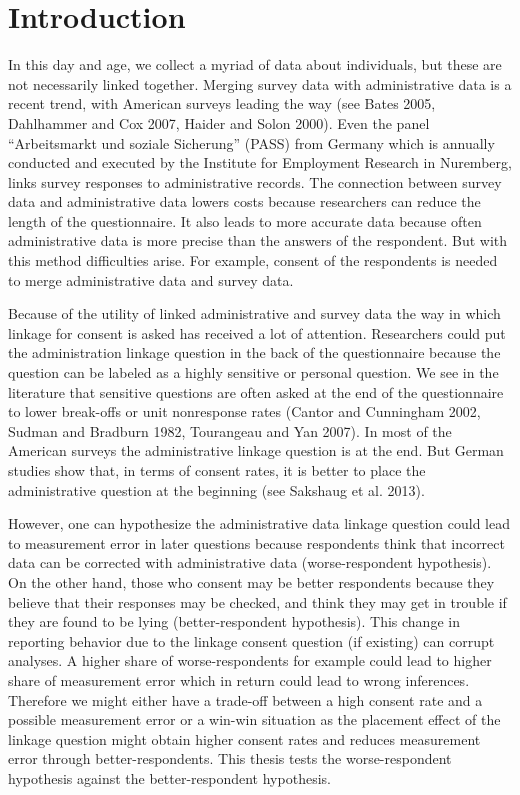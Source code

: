 \section{Introduction}

In this day and age, we collect a myriad of data about individuals, but these are not necessarily linked together. Merging survey data with administrative data is a recent trend, with American surveys leading the way (see Bates 2005, Dahlhammer and Cox 2007, Haider and Solon 2000). Even the panel ``Arbeitsmarkt und soziale Sicherung'' (PASS) from Germany which is annually conducted and executed by the Institute for Employment Research in Nuremberg, links survey responses to administrative records. The connection between survey data and administrative data lowers costs because researchers can reduce the length of the questionnaire. It also leads to more accurate data because often administrative data is more precise than the answers of the respondent. But with this method difficulties arise. For example, consent of the respondents is needed to merge administrative data and survey data. 

Because of the utility of linked administrative and survey data the way in which linkage for consent is asked has received a lot of attention. Researchers could put the administration linkage question in the back of the questionnaire because the question can be labeled as a highly sensitive or personal question. We see in the literature that sensitive questions are often asked at the end of the questionnaire to lower break-offs or unit nonresponse rates (Cantor and Cunningham 2002, Sudman and Bradburn 1982, Tourangeau and Yan 2007). In most of the American surveys the administrative linkage question is at the end. But German studies show that, in terms of consent rates, it is better to place the administrative question at the beginning (see Sakshaug et al. 2013). 

However, one can hypothesize the administrative data linkage question could lead to measurement error in later questions because respondents think that incorrect data can be corrected with administrative data (worse-respondent hypothesis). On the other hand, those who consent may be better respondents because they believe that their responses may be checked, and think they may get in trouble if they are found to be lying (better-respondent hypothesis). This change in reporting behavior due to the linkage consent question (if existing) can corrupt analyses. A higher share of worse-respondents for example could lead to higher share of measurement error which in return could lead to wrong inferences. Therefore we might either have a trade-off between a high consent rate and a possible measurement error or a win-win situation as the placement effect of the linkage question might obtain higher consent rates and reduces measurement error through better-respondents. This thesis tests the worse-respondent hypothesis against the better-respondent hypothesis.

